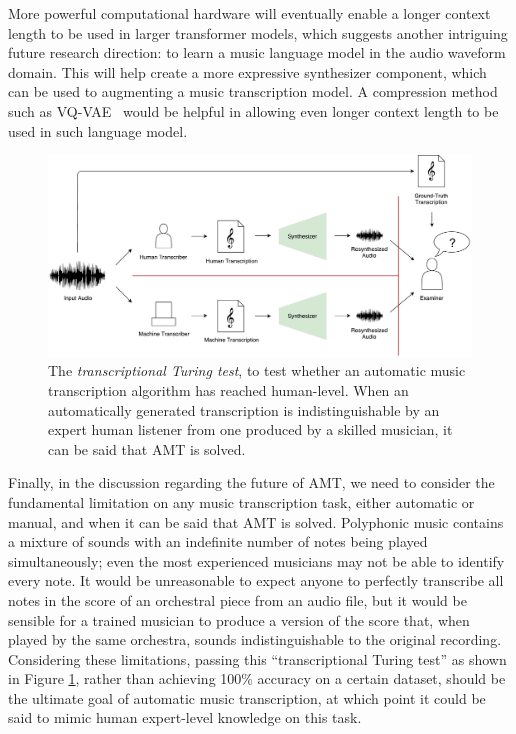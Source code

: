 More powerful computational hardware will eventually enable a longer context length to be used in larger transformer models, which suggests another intriguing future research direction: to learn a music language model in the audio waveform domain.
This will help create a more expressive synthesizer component, which can be used to augmenting a music transcription model.
A compression method such as VQ-VAE~\cite{oord2017vqvae} would be helpful in allowing even longer context length to be used in such language model.

\begin{figure}[b!]
	\includegraphics[width=\textwidth]{turing.pdf}
	\caption{The \emph{transcriptional Turing test}, to test whether an automatic music transcription algorithm has reached human-level. When an automatically generated transcription is indistinguishable by an expert human listener from one produced by a skilled musician, it can be said that AMT is solved.}
	\label{fig:turing}
\end{figure}


Finally, in the discussion regarding the future of AMT, we need to consider the fundamental limitation on any music transcription task, either automatic or manual, and when it can be said that AMT is solved.
Polyphonic music contains a mixture of sounds with an indefinite number of notes being played simultaneously; even the most experienced musicians may not be able to identify every note. %
It would be unreasonable to expect anyone to perfectly transcribe all notes in the score of an orchestral piece from an audio file, but it would be sensible for a trained musician to produce a version of the score that, when played by the same orchestra, sounds indistinguishable to the original recording.
Considering these limitations, passing this ``transcriptional Turing test'' as shown in Figure \ref{fig:turing}, rather than achieving 100\% accuracy on a certain dataset, should be the ultimate goal of automatic music transcription, at which point it could be said to mimic human expert-level knowledge on this task.

